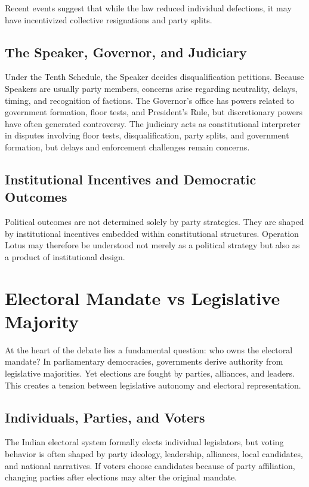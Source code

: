 \documentclass[11pt]{article}
\begin{document}
Recent events suggest that while the law reduced individual defections, it may have incentivized collective resignations and party splits.

\subsection{The Speaker, Governor, and Judiciary}
Under the Tenth Schedule, the Speaker decides disqualification petitions. Because Speakers are usually party members, concerns arise regarding neutrality, delays, timing, and recognition of factions. The Governor's office has powers related to government formation, floor tests, and President's Rule, but discretionary powers have often generated controversy. The judiciary acts as constitutional interpreter in disputes involving floor tests, disqualification, party splits, and government formation, but delays and enforcement challenges remain concerns.

\subsection{Institutional Incentives and Democratic Outcomes}
Political outcomes are not determined solely by party strategies. They are shaped by institutional incentives embedded within constitutional structures. Operation Lotus may therefore be understood not merely as a political strategy but also as a product of institutional design.

\section{Electoral Mandate vs Legislative Majority}
At the heart of the debate lies a fundamental question: who owns the electoral mandate? In parliamentary democracies, governments derive authority from legislative majorities. Yet elections are fought by parties, alliances, and leaders. This creates a tension between legislative autonomy and electoral representation.

\subsection{Individuals, Parties, and Voters}
The Indian electoral system formally elects individual legislators, but voting behavior is often shaped by party ideology, leadership, alliances, local candidates, and national narratives. If voters choose candidates because of party affiliation, changing parties after elections may alter the original mandate.
\end{document}
